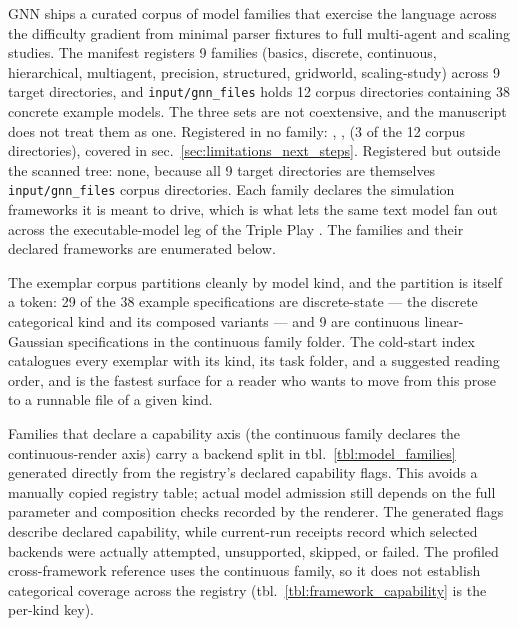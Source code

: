 \documentclass[
  english,
  9pt,
]{extarticle}
\newcounter{none} %
\begin{document}
GNN ships a curated corpus of model families that exercise the language
across the difficulty gradient from minimal parser fixtures to full
multi-agent and scaling studies. The manifest registers 9 families
(basics, discrete, continuous, hierarchical, multiagent, precision,
structured, gridworld, scaling-study) across 9 target directories, and
\texttt{input/gnn\_files} holds 12 corpus directories containing 38
concrete example models. The three sets are not coextensive, and the
manuscript does not treat them as one. Registered in no family:
, ,
 (3 of the 12 corpus directories),
covered in sec.~\ref{sec:limitations_next_steps}. Registered but outside
the scanned tree: none, because all 9 target directories are themselves
\texttt{input/gnn\_files} corpus directories. Each family declares the
simulation frameworks it is meant to drive, which is what lets the same
text model fan out across the executable-model leg of the Triple Play
\citep{gnn2023}. The families and their declared frameworks are
enumerated below.

The exemplar corpus partitions cleanly by model kind, and the partition
is itself a token: 29 of the 38 example specifications are
discrete-state --- the discrete categorical kind and its composed
variants --- and 9 are continuous linear-Gaussian specifications in the
continuous family folder. The cold-start index
 catalogues every exemplar with its
kind, its task folder, and a suggested reading order, and is the fastest
surface for a reader who wants to move from this prose to a runnable
file of a given kind.

Families that declare a capability axis (the continuous family declares
the continuous-render axis) carry a backend split in
tbl.~\ref{tbl:model_families} generated directly from the registry's
declared capability flags. This avoids a manually copied registry table;
actual model admission still depends on the full parameter and
composition checks recorded by the renderer. The generated flags
describe declared capability, while current-run receipts record which
selected backends were actually attempted, unsupported, skipped, or
failed. The profiled cross-framework reference uses the continuous
family, so it does not establish categorical coverage across the
registry (tbl.~\ref{tbl:framework_capability} is the per-kind key).
\end{document}
